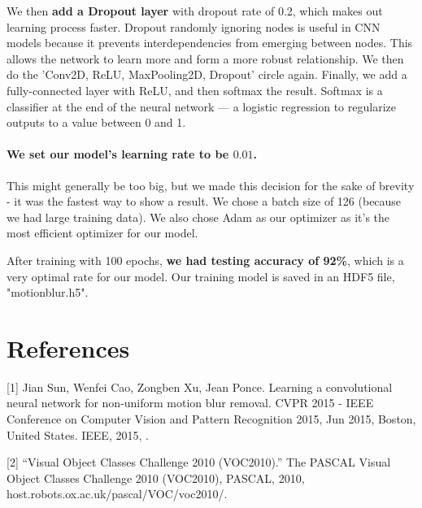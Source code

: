 \documentclass{article}
\begin{document}
We then \textbf{add a Dropout layer} with dropout rate of 0.2, which makes out learning 
process faster. Dropout randomly ignoring nodes is useful in CNN models because it 
prevents interdependencies from emerging between nodes. This allows the network to learn 
more and form a more robust relationship. We then do the 'Conv2D, ReLU, MaxPooling2D, 
Dropout' circle again. Finally, we add a fully-connected layer with ReLU, and then 
softmax the result. Softmax is a classifier at the end of the neural network — a logistic 
regression to regularize outputs to a value between 0 and 1. 

\paragraph{We set our model's learning rate to be $0.01$.} This might generally be too 
big, but we made this decision for the sake of brevity - it was the fastest way to show 
a result. We chose a batch size of 126 (because we had large training data). We also 
chose Adam as our optimizer as it's the most efficient optimizer for our model.

After training with 100 epochs, \textbf{we had testing accuracy of 92\%}, which is a 
very optimal rate for our model. Our training model is saved in an HDF5 file, 
"motionblur.h5".  

\section*{References}
\medskip
\small

[1] Jian Sun, Wenfei Cao, Zongben Xu, Jean Ponce. Learning a convolutional neural network 
for non-uniform motion blur removal. CVPR 2015 - IEEE Conference on Computer Vision and 
Pattern Recognition 2015, Jun 2015, Boston, United States. IEEE, 2015, .

[2] “Visual Object Classes Challenge 2010 (VOC2010).” The PASCAL Visual Object Classes 
Challenge 2010 (VOC2010), PASCAL, 2010, host.robots.ox.ac.uk/pascal/VOC/voc2010/.
\end{document}
